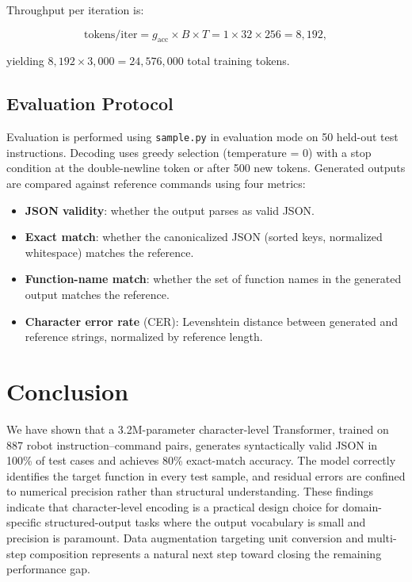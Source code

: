 \documentclass[11pt,a4paper]{article}
\begin{document}
Throughput per iteration is:

\begin{equation}
    \text{tokens/iter} = g_{\text{acc}} \times B \times T = 1 \times 32 \times 256 = 8{,}192,
\end{equation}

yielding $8{,}192 \times 3{,}000 = 24{,}576{,}000$ total training tokens.

\subsection{Evaluation Protocol}

Evaluation is performed using \texttt{sample.py} in evaluation mode on 50 held-out test instructions.
Decoding uses greedy selection (temperature = 0) with a stop condition at the double-newline token or after 500 new tokens.
Generated outputs are compared against reference commands using four metrics:

\begin{itemize}[leftmargin=*,nosep]
    \item \textbf{JSON validity}: whether the output parses as valid JSON.
    \item \textbf{Exact match}: whether the canonicalized JSON (sorted keys, normalized whitespace) matches the reference.
    \item \textbf{Function-name match}: whether the set of function names in the generated output matches the reference.
    \item \textbf{Character error rate} (CER): Levenshtein distance between generated and reference strings, normalized by reference length.
\end{itemize}

\section{Conclusion}

We have shown that a 3.2M-parameter character-level Transformer,
trained on 887 robot instruction--command pairs,
generates syntactically valid JSON in 100\% of test cases and achieves 80\% exact-match accuracy.
The model correctly identifies the target function in every test sample,
and residual errors are confined to numerical precision rather than structural understanding.
These findings indicate that character-level encoding is a practical design choice
for domain-specific structured-output tasks where the output vocabulary is small and precision is paramount.
Data augmentation targeting unit conversion and multi-step composition represents a natural next step
toward closing the remaining performance gap.
\end{document}
